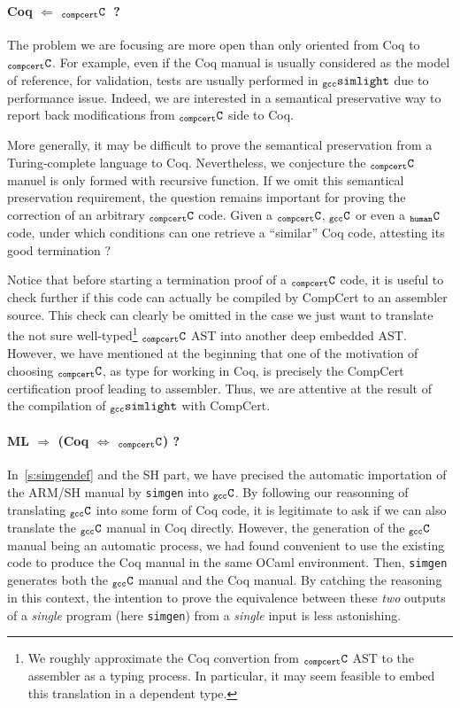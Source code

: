 \documentclass[a4paper, 11pt]{article}
\newcommand{\gccSL}{$_{\tt gcc}{\tt simlight}$\xspace}
\newcommand{\simgen}{{\tt simgen}\xspace}
\newcommand{\C}{$_{\tt compcert}{\tt C}$\xspace}
\newcommand{\gccC}{$_{\tt gcc}{\tt C}$\xspace}
\newcommand{\hC}{$_{\tt human}{\tt C}$\xspace}
\begin{document}
\paragraph{Coq $\Longleftarrow$ \C~?}
The problem we are focusing are more open than only oriented from Coq to \C. For example, even if the Coq manual is usually considered as the model of reference, for validation, tests are usually performed in \gccSL due to performance issue. Indeed, we are interested in a semantical preservative way to report back modifications from \C side to Coq. 

More generally, it may be difficult to prove the semantical preservation from a Turing-complete language to Coq. Nevertheless, we conjecture the \C manuel is only formed with recursive function. If we omit this semantical preservation requirement, the question remains important for proving the correction of an arbitrary \C code. Given a \C, \gccC or even a \hC code, under which conditions can one retrieve a ``similar'' Coq code, attesting its good termination ? 

Notice that before starting a termination proof of a \C code, it is useful to check further if this code can actually be compiled by CompCert to an assembler source. This check can clearly be omitted in the case we just want to translate the not sure well-typed\footnote{We roughly approximate the Coq convertion from \C AST to the assembler as a typing process. In particular, it may seem feasible to embed this translation in a dependent type.} \C AST into another deep embedded AST.
However, we have mentioned at the beginning that one of the motivation of choosing \C, as type for working in Coq, is precisely the CompCert certification proof leading to assembler. Thus, we are attentive at the result of the compilation of \gccSL with CompCert.

\paragraph{ML $\Longrightarrow$ (Coq $\Longleftrightarrow$ \C) ?}

In~\ref{s:simgendef} and the SH part, we have precised the automatic importation of the ARM/SH manual by \simgen into \gccC. By following our reasonning of translating \gccC into some form of Coq code, it is legitimate to ask if we can also translate the \gccC manual in Coq directly. However, the generation of the \gccC manual being an automatic process, we had found convenient to use the existing code to produce the Coq manual in the same OCaml environment. Then, \simgen generates both the \gccC manual and the Coq manual. By catching the reasoning in this context, the intention to prove the equivalence between these \emph{two} outputs of a \emph{single} program (here \simgen) from a \emph{single} input is less astonishing. 
\end{document}
